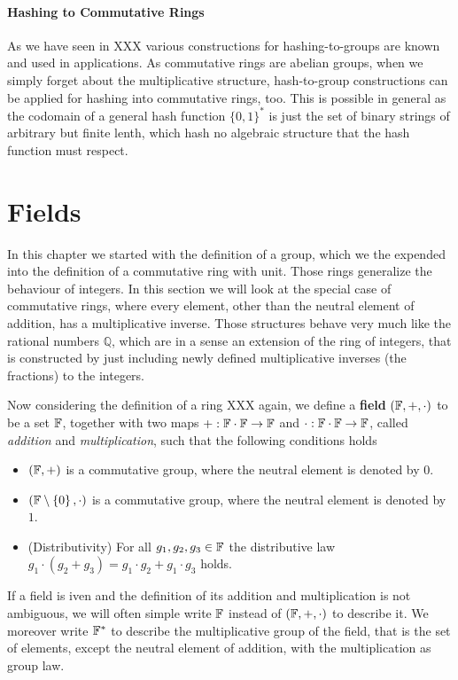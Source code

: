 \paragraph{Hashing to Commutative Rings} As we have seen in XXX various constructions for hashing-to-groups are known and used in applications. As commutative rings are abelian groups, when we simply forget about the multiplicative structure, hash-to-group constructions can be applied for hashing into commutative rings, too. This is possible in general as the codomain of a general hash function $\{0,1\}^*$ is just the set of binary strings of arbitrary but finite lenth, which hash no algebraic structure that the hash function must respect.

\section{Fields}
In this chapter we started with the definition of a group, which we the expended into the definition of a commutative ring with unit. Those rings generalize the behaviour of integers. In this section we will look at the special case of commutative rings, where every element, other than the neutral element of addition, has a multiplicative inverse. Those structures behave very much like the rational numbers $\mathbb{Q}$, which are in a sense an extension of the ring of integers, that is constructed by just including newly defined multiplicative inverses (the fractions) to the integers.

Now considering the definition of a ring XXX again, we define a \textbf{field} $ (\mathbb{F}, +, \cdot) $ to be a set $ \mathbb{F}$, together with two maps $ +: \mathbb{F} \cdot \mathbb{F} \to \mathbb{F} $ and $ \cdot: \mathbb{F} \cdot \mathbb{F} \to \mathbb{F} $, called \textit{addition} and \textit{multiplication}, such that the following conditions holds
\begin{itemize}
\item $ \left (\mathbb{F}, + \right) $ is a commutative group, where the neutral element is denoted by $ 0 $.
\item $ \left (\mathbb{F} \setminus \left \{0 \right \}, \cdot \right) $ is a commutative group, where the neutral element is denoted by $ 1 $.
\item (Distributivity) For all $ g_1, g_2, g_3 \in \mathbb{F} $ the distributive law
$g_1 \cdot \left (g_2 + g_3 \right) = g_1 \cdot g_2 + g_1 \cdot g_3$ holds.
\end{itemize}
If a field is iven and the definition of its addition and multiplication is not ambiguous, we will often simple write $\mathbb{F}$ instead of $(\mathbb{F},+,\cdot)$ to describe it. We moreover write $\mathbb{F}^*$ to describe the multiplicative group of the field, that is the set of elements, except the neutral element of addition, with the multiplication as group law.

